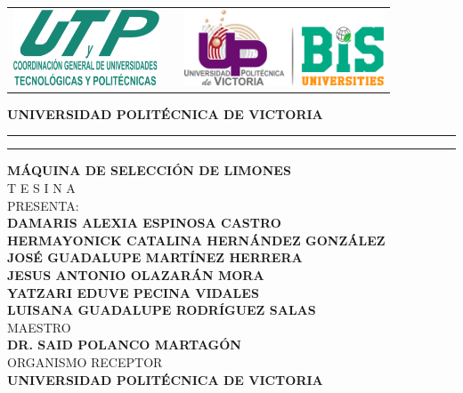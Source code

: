 \documentclass[12pt]{article}
\date{\specialdate\today}
\newcommand{\HRule}{\rule{\linewidth}{0.25mm}}
\newcommand{\maestro}{Dr. Said Polanco Martagón}
\newcommand{\NombreAlumnoJesus}{Jesus Antonio Olazarán Mora}
\newcommand{\NombreAlumnoDamaris}{Damaris Alexia Espinosa Castro}
\newcommand{\NombreAlumnoLuisana}{Luisana Guadalupe Rodríguez  Salas}
\newcommand{\NombreAlumnoHer}{Hermayonick Catalina Hernández González}
\newcommand{\NombreAlumnoJose}{José Guadalupe Martínez Herrera}
\newcommand{\NombreAlumnoYatzari}{Yatzari Eduve Pecina Vidales}
\newcommand{\NombreProyecto}{Máquina de selección de limones}
\newcommand{\organismoreceptor}   {Universidad Politécnica de Victoria}
\newcommand{\separacionCorta}{0.0cm}
\newcommand{\separacionLarga}{1.2cm}
\newcommand{\iemph}[1]{\MakeTextUppercase{#1}}
\begin{document}
\setcounter{page}{1}
\thispagestyle{empty}

\begin{center}

\begin{tabular}{cp{5cm}c}
\includegraphics[height=2.25cm]{UTYP.png} & 
& \includegraphics[height=2.25cm]{LogoUPV_2023.png}   \\
\end{tabular}

\Large \textbf{UNIVERSIDAD POLITÉCNICA DE VICTORIA}
\vspace{0.5cm}
\hrule
\vspace{0.1cm} 
\hrule
\vspace{0.5cm}


\textbf{\iemph{\NombreProyecto}} \\[\separacionLarga]
T E S I N A \\[\separacionLarga]

PRESENTA: \\[\separacionCorta]
\textbf{\iemph{\NombreAlumnoDamaris}}\\[\separacionCorta]
\textbf{\iemph{\NombreAlumnoHer}}\\[\separacionCorta]
\textbf{\iemph{\NombreAlumnoJose}}\\[\separacionCorta]
\textbf{\iemph{\NombreAlumnoJesus}}\\[\separacionCorta]
\textbf{\iemph{\NombreAlumnoYatzari}}\\[\separacionCorta]
\textbf{\iemph{\NombreAlumnoLuisana}}\\[\separacionLarga]


MAESTRO \\[\separacionCorta]
\textbf{\iemph{\maestro}} \\[\separacionLarga]

ORGANISMO RECEPTOR \\[\separacionCorta]
\textbf{\iemph{\organismoreceptor}} \\[\separacionLarga]

\end{center}
\end{document}
